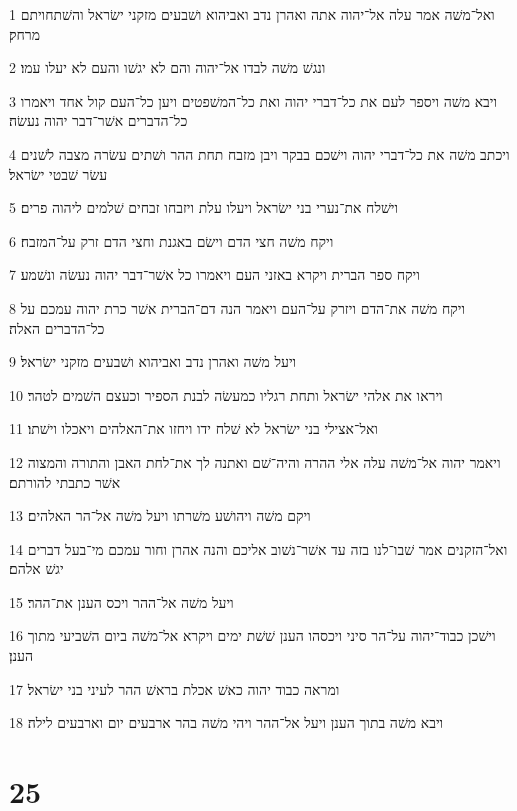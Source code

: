 \par 1 ואל־משׁה אמר עלה אל־יהוה אתה ואהרן נדב ואביהוא ושׁבעים מזקני ישׂראל והשׁתחויתם מרחק׃
\par 2 ונגשׁ משׁה לבדו אל־יהוה והם לא יגשׁו והעם לא יעלו עמו׃
\par 3 ויבא משׁה ויספר לעם את כל־דברי יהוה ואת כל־המשׁפטים ויען כל־העם קול אחד ויאמרו כל־הדברים אשׁר־דבר יהוה נעשׂה׃
\par 4 ויכתב משׁה את כל־דברי יהוה וישׁכם בבקר ויבן מזבח תחת ההר ושׁתים עשׂרה מצבה לשׁנים עשׂר שׁבטי ישׂראל׃
\par 5 וישׁלח את־נערי בני ישׂראל ויעלו עלת ויזבחו זבחים שׁלמים ליהוה פרים׃
\par 6 ויקח משׁה חצי הדם וישׂם באגנת וחצי הדם זרק על־המזבח׃
\par 7 ויקח ספר הברית ויקרא באזני העם ויאמרו כל אשׁר־דבר יהוה נעשׂה ונשׁמע׃
\par 8 ויקח משׁה את־הדם ויזרק על־העם ויאמר הנה דם־הברית אשׁר כרת יהוה עמכם על כל־הדברים האלה׃
\par 9 ויעל משׁה ואהרן נדב ואביהוא ושׁבעים מזקני ישׂראל׃
\par 10 ויראו את אלהי ישׂראל ותחת רגליו כמעשׂה לבנת הספיר וכעצם השׁמים לטהר׃
\par 11 ואל־אצילי בני ישׂראל לא שׁלח ידו ויחזו את־האלהים ויאכלו וישׁתו׃
\par 12 ויאמר יהוה אל־משׁה עלה אלי ההרה והיה־שׁם ואתנה לך את־לחת האבן והתורה והמצוה אשׁר כתבתי להורתם׃
\par 13 ויקם משׁה ויהושׁע משׁרתו ויעל משׁה אל־הר האלהים׃
\par 14 ואל־הזקנים אמר שׁבו־לנו בזה עד אשׁר־נשׁוב אליכם והנה אהרן וחור עמכם מי־בעל דברים יגשׁ אלהם׃
\par 15 ויעל משׁה אל־ההר ויכס הענן את־ההר׃
\par 16 וישׁכן כבוד־יהוה על־הר סיני ויכסהו הענן שׁשׁת ימים ויקרא אל־משׁה ביום השׁביעי מתוך הענן׃
\par 17 ומראה כבוד יהוה כאשׁ אכלת בראשׁ ההר לעיני בני ישׂראל׃
\par 18 ויבא משׁה בתוך הענן ויעל אל־ההר ויהי משׁה בהר ארבעים יום וארבעים לילה׃

\chapter{25}

